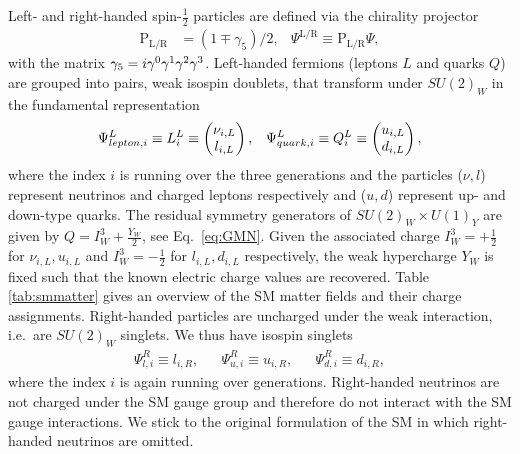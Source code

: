  Left- and right-handed spin-$\frac{1}{2}$ particles are defined via the
 chirality projector 
 \begin{align}
 \text{P}_{\text{L/R}}&=(1\mp \gamma_5)/2,& \Psi^{\text{L/R}}\equiv  \text{P}_{\text{L/R}} \Psi,
 \end{align}
with the matrix $\g5=i\gamma^0\gamma^1\gamma^2\gamma^3$. Left-handed fermions (leptons $L$ and quarks $Q$) are grouped into pairs, weak
isospin doublets, that transform under $SU(2)_W$ in the
fundamental representation
\begin{align}
 \Psi_{lepton,i}^L \equiv L_i^L\equiv \pmqty{\nu_{i,L}\\l_{i,L}}, && \Psi_{quark,i}^L\equiv Q_i^L \equiv \pmqty{u_{i,L}\\d_{i,L}},
\end{align}
where the index $i$ is running over the three generations and the
particles ($\nu, l$) represent neutrinos and charged leptons
respectively and ($u, d$) represent up- and down-type
quarks. The residual symmetry generators of $SU(2)_W\times
U(1)_Y$ are given by $Q = I_W^3+\frac{Y_W}{2}$, see
Eq.~\eqref{eq:GMN}. Given the associated charge $I_W^3=+\frac{1}{2}$ for
$\nu_{i,L},u_{i,L}$ and $I_W^3=-\frac{1}{2}$ for $l_{i,L},d_{i,L}$ respectively, the weak hypercharge $Y_W$ is fixed such
that the known electric charge values are recovered. Table
\ref{tab:smmatter} gives an overview of
the SM matter fields and their charge assignments. Right-handed particles are uncharged under the weak interaction, i.e.~are $SU(2)_W$ singlets. We thus have isospin singlets 
\begin{align}
  \Psi_{l,i}^R\equiv l_{i,R}, &&
   \Psi_{u,i}^R\equiv u_{i,R}, &&\Psi_{d,i}^R\equiv d_{i,R},
\end{align}
where the index $i$ is again running over generations. Right-handed
neutrinos are not charged under the SM
gauge group and therefore do not interact with the SM gauge
interactions. We stick to the original formulation of the SM in which right-handed
neutrinos are omitted. 


